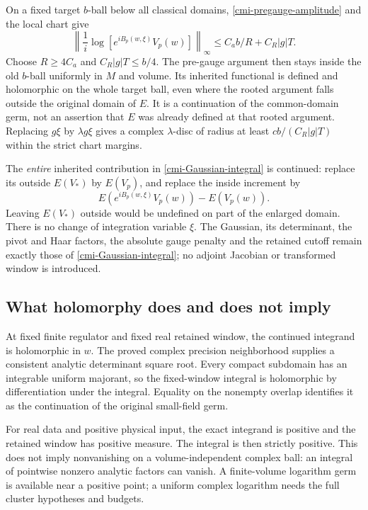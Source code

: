 On a fixed target $b$-ball below all classical domains,
\eqref{cmi-pregauge-amplitude} and the local chart give
\begin{equation}\label{cmi-common-ball}
 \left\|\frac1i\log[e^{iB_p(w,\xi)}V_p(w)]\right\|_\infty
       \le C_a b/R+C_R|g|T.
\end{equation}
Choose $R\ge4C_a$ and $C_R|g|T\le b/4$.
The pre-gauge argument then stays inside the old $b$-ball
uniformly in $M$ and volume. Its inherited functional is
defined and holomorphic on the whole target ball, even
where the rooted argument falls outside the original
domain of $E$. It is a continuation of the common-domain
germ, not an assertion that $E$ was already defined at
that rooted argument. Replacing $g\xi$ by $\lambda g\xi$
gives a complex $\lambda$-disc of radius at least
$cb/(C_R|g|T)$ within the strict chart margins.

The \emph{entire} inherited contribution in
\eqref{cmi-Gaussian-integral} is continued: replace its
outside $E(V_*)$ by $E(V_p)$, and replace the inside
increment by
\[
 E(e^{iB_p(w,\xi)}V_p(w))-E(V_p(w)).
\]
Leaving $E(V_*)$ outside would be undefined on part of
the enlarged domain. There is no change of integration
variable $\xi$. The Gaussian, its determinant, the pivot
and Haar factors, the absolute gauge penalty and the
retained cutoff remain exactly those of
\eqref{cmi-Gaussian-integral}; no adjoint Jacobian or
transformed window is introduced.

\subsection{What holomorphy does and does not imply}
\label{cmi-scope-section}

At fixed finite regulator and fixed real retained window,
the continued integrand is holomorphic in $w$. The proved
complex precision neighborhood supplies a consistent
analytic determinant square root. Every compact subdomain
has an integrable uniform majorant, so the fixed-window
integral is holomorphic by differentiation under the
integral. Equality on the nonempty overlap identifies it
as the continuation of the original small-field germ.

For real data and positive physical input, the exact
integrand is positive and the retained window has positive
measure. The integral is then strictly positive. This
does not imply nonvanishing on a volume-independent
complex ball: an integral of pointwise nonzero analytic
factors can vanish. A finite-volume logarithm germ is
available near a positive point; a uniform complex
logarithm needs the full cluster hypotheses and budgets.

